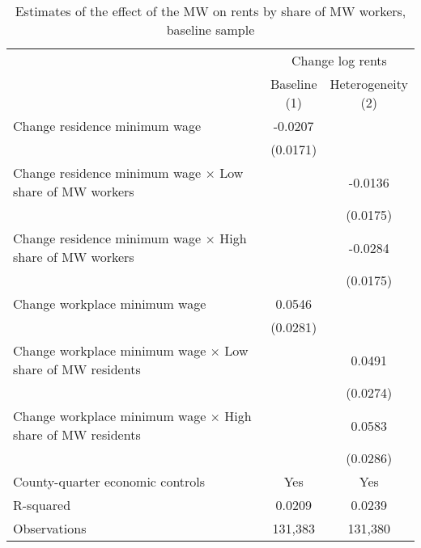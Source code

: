 \begin{table}[hbt!] \centering
    \caption{Estimates of the effect of the MW on rents by share of MW workers, baseline sample}
    \label{tab:heterogeneity}
    \begin{tabular}{@{}lcc@{}}
        \toprule
            & \multicolumn{2}{c}{Change log rents}                                         \\ \cmidrule(l){2-3} 
            & \shortstack{Baseline \\(1)} 
            & \shortstack{Heterogeneity \\(2)}                                             \\ \midrule
        Change residence minimum wage                                     &  -0.0207   &       \\
                                                                          & (0.0171)  &       \\
        Change residence minimum wage $\times$ Low share of MW workers    &        &  -0.0136  \\ 
                                                                          &        & (0.0175) \\   
        Change residence minimum wage $\times$ High share of MW workers   &        &  -0.0284  \\
                                                                          &        & (0.0175) \\
        Change workplace minimum wage                                     &  0.0546   &       \\
                                                                          & (0.0281)  &       \\
        Change workplace minimum wage $\times$ Low share of MW residents  &        &  0.0491  \\
                                                                          &        & (0.0274) \\
        Change workplace minimum wage $\times$ High share of MW residents &        &  0.0583  \\
                                                                          &        & (0.0286) \\
        County-quarter economic controls                                  &  Yes   &  Yes  \\
        R-squared                                                         &  0.0209   &  0.0239  \\
        Observations                                                      &  131,383  &  131,380 \\ \bottomrule
    \end{tabular}


\end{table}

